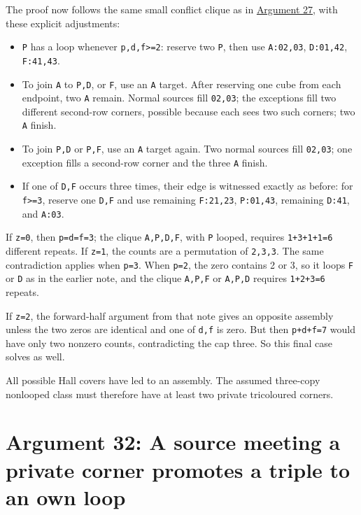 \documentclass[
  10pt,
]{article}
\providecommand{\tightlist}{%
  \setlength{\itemsep}{0pt}\setlength{\parskip}{0pt}}
\begin{document}
The proof now follows the same small conflict clique as in
\protect\hyperlink{arg-27}{Argument 27}, with these explicit
adjustments:

\begin{itemize}
\tightlist
\item
  \texttt{P} has a loop whenever \texttt{p,d,f\textgreater{}=2}: reserve
  two \texttt{P}, then use \texttt{A:02,03}, \texttt{D:01,42},
  \texttt{F:41,43}.
\item
  To join \texttt{A} to \texttt{P,D}, or \texttt{F}, use an \texttt{A}
  target. After reserving one cube from each endpoint, two \texttt{A}
  remain. Normal sources fill \texttt{02,03}; the exceptions fill two
  different second-row corners, possible because each sees two such
  corners; two \texttt{A} finish.
\item
  To join \texttt{P,D} or \texttt{P,F}, use an \texttt{A} target again.
  Two normal sources fill \texttt{02,03}; one exception fills a
  second-row corner and the three \texttt{A} finish.
\item
  If one of \texttt{D,F} occurs three times, their edge is witnessed
  exactly as before: for \texttt{f\textgreater{}=3}, reserve one
  \texttt{D,F} and use remaining \texttt{F:21,23}, \texttt{P:01,43},
  remaining \texttt{D:41}, and \texttt{A:03}.
\end{itemize}

If \texttt{z=0}, then \texttt{p=d=f=3}; the clique \texttt{A,P,D,F},
with \texttt{P} looped, requires \texttt{1+3+1+1=6} different repeats.
If \texttt{z=1}, the counts are a permutation of \texttt{2,3,3}. The
same contradiction applies when \texttt{p=3}. When \texttt{p=2}, the
zero contains 2 or 3, so it loops \texttt{F} or \texttt{D} as in the
earlier note, and the clique \texttt{A,P,F} or \texttt{A,P,D} requires
\texttt{1+2+3=6} repeats.

If \texttt{z=2}, the forward-half argument from that note gives an
opposite assembly unless the two zeros are identical and one of
\texttt{d,f} is zero. But then \texttt{p+d+f=7} would have only two
nonzero counts, contradicting the cap three. So this final case solves
as well.

All possible Hall covers have led to an assembly. The assumed three-copy
nonlooped class must therefore have at least two private tricoloured
corners.

\hypertarget{arg-32}{%
\section{Argument 32: A source meeting a private corner promotes a
triple to an own loop}\label{arg-32}}
\end{document}
